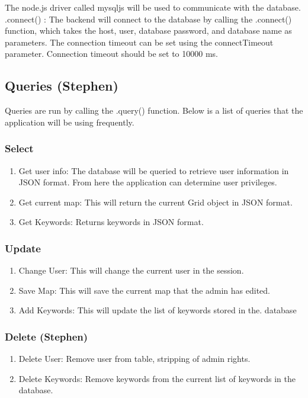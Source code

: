 \documentclass[letterpaper,10pt,titlepage, onecolumn, compsoc]{IEEEtran}
\begin{document}
The node.js driver called mysqljs will be used to communicate with the database.
.connect() : The backend will connect to the database by calling the .connect() function, which takes the host, user, database password, and database name as parameters. The connection timeout can be set using the connectTimeout parameter. Connection timeout should be set to 10000 ms.




\subsection{Queries (Stephen)}
 Queries are run by calling the .query() function. Below is a list of queries that the application will be using frequently.

\subsubsection{Select}
\begin{enumerate}
	\item Get user info: The database will be queried to retrieve user information in JSON format. From here the application can determine user privileges.
    \item Get current map: This will return the current Grid object in JSON format.
    \item Get Keywords: Returns keywords in JSON format.
\end{enumerate}
\subsubsection{Update}
\begin{enumerate}
	\item Change User: This will change the current user in the session.
    \item Save Map: This will save the current map that the admin has edited.
    \item  Add Keywords: This will update the list of keywords stored in the. database
\end{enumerate}

\subsubsection{Delete (Stephen)}
\begin{enumerate}
	\item Delete User: Remove user from table, stripping of admin rights.
    \item Delete Keywords: Remove keywords from the current list of keywords in the database.
\end{enumerate}
\end{document}

